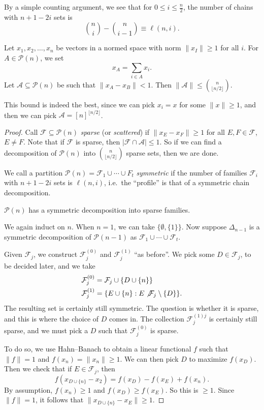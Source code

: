 \documentclass[a4paper]{article}
\begin{document}
By a simple counting argument, we see that for $0 \leq i \leq \frac{n}{2}$, the number of chains with $n + 1 - 2i$ sets is
\[
  \binom{n}{i} - \binom{n}{i - 1} \equiv \ell(n, i).
\]
\begin{thm}[Kleitman, 1970]
  Let $x_1, x_2, \ldots, x_n$ be vectors in a normed space with norm $\|x_I\| \geq 1$ for all $i$. For $A \in \mathcal{P}(n)$, we set
  \[
    x_A = \sum_{i \in A} x_i.
  \]
  Let $\mathcal{A} \subseteq \mathcal{P}(n)$ be such that $\|x_A - x_B\|< 1$. Then $\|\mathcal{A}\| \leq \binom{n}{\lfloor n/2\rfloor}$.
\end{thm}
This bound is indeed the best, since we can pick $x_i = x$ for some $\|x\| \geq 1$, and then we can pick $\mathcal{A} = [n]^{\lfloor n/2\rfloor}$.

\begin{proof}
  Call $\mathcal{F} \subseteq \mathcal{P}(n)$ \emph{sparse} (or \emph{scattered}) if $\|x_E - x_F\| \geq 1$ for all $E, F \in \mathcal{F}$, $E \not= F$. Note that if $\mathcal{F}$ is sparse, then $|\mathcal{F} \cap \mathcal{A}| \leq 1$. So if we can find a decomposition of $\mathcal{P}(n)$ into $\binom{n}{\lfloor n/2\rfloor}$ sparse sets, then we are done.

  We call a partition $\mathcal{P}(n) = \mathcal{F}_1 \cup \cdots \cup F_t$ \emph{symmetric} if the number of families $\mathcal{F}_i$ with $n + 1 - 2i$ sets is $\ell(n, i)$, i.e.\ the ``profile'' is that of a symmetric chain decomposition.

  \begin{claim}
    $\mathcal{P}(n)$ has a symmetric decomposition into sparse families.
  \end{claim}

  We again induct on $n$. When $n = 1$, we can take $\{\emptyset, \{1\}\}$. Now suppose $\Delta_{n - 1}$ is a symmetric decomposition of $\mathcal{P}(n - 1)$ as $\mathcal{F}_1 \cup \cdots \cup \mathcal{F}_t$.

  Given $\mathcal{F}_j$, we construct $\mathcal{F}_j^{(0)}$ and $\mathcal{F}_j^{(1)}$ ``as before''. We pick some $D \in \mathcal{F}_j$, to be decided later, and we take
  \begin{align*}
    \mathcal{F}_j^{(0)} &= \mathcal{F}_j \cup\{ D \cup \{n\}\}\\
    \mathcal{F}_j^{(1)} &= \{ E \cup \{n\}: E \not \mathcal{F}_j \setminus \{D\}\}.
  \end{align*}
  The resulting set is certainly still symmetric. The question is whether it is sparse, and this is where the choice of $D$ comes in. The collection $\mathcal{F}_j^{(1)j}$ is certainly still sparse, and we must pick a $D$ such that $\mathcal{F}_j^{(0)}$ is sparse.

  To do so, we use Hahn--Banach to obtain a linear functional $f$ such that $\|f\| = 1$ and $f(x_n) = \|x_n\| \geq 1$. We can then pick $D$ to maximize $f(x_D)$. Then we check that if $E \in \mathcal{F}_j$, then
  \[
    f(x_{D \cup \{n\}} - x_2) = f(x_D) - f(x_E) + f(x_n).
  \]
  By assumption, $f(x_n) \geq 1$ and $f(x_D) \geq f(x_E)$. So this is $\geq 1$. Since $\|f\| = 1$, it follows that $\|x_{D \cup \{n\}} - x_E\| \geq 1$.
\end{proof}
\end{document}
